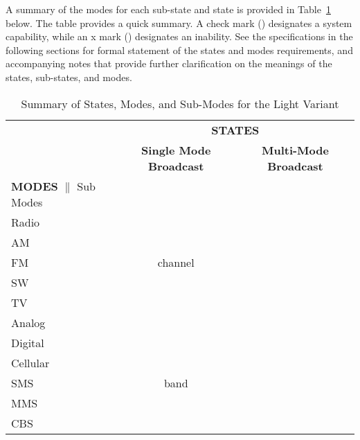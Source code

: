 A summary of the modes for each sub-state and state is provided in Table~\ref{tab:Light-StatesAndModes} below.
The table provides a quick summary. A check mark (\cmark) designates a system capability, while an x mark (\xmark) designates an inability.
See the specifications in the following sections for formal statement of the states and modes requirements, and accompanying notes that provide further clarification on the meanings of the states, sub-states, and modes.
\begin{table}[htbp]
	\begin{center}
		\begin{tabular}{|lcc|}
			\hline
			     &    \multicolumn{2}{c|}{{\bf STATES}}\\
			     & {\bf Single Mode Broadcast} & {\bf Multi-Mode Broadcast}	\\
{\bf MODES}	$\|$	Sub Modes	&		&	\\
Radio												&					&					\\\hline
\hspace{3mm}AM							& \xmark  & \xmark	\\\hline
\hspace{3mm}FM							& \cmark 1 channel &	\xmark	\\\hline
\hspace{3mm}SW							& \xmark  & \xmark	\\\hline
TV													&					&						\\\hline
\hspace{3mm}Analog 					& \xmark  & \xmark		\\\hline
\hspace{3mm}Digital					& \xmark  & \xmark		\\\hline
Cellular										&					&						\\\hline
\hspace{3mm}SMS							& \cmark 1 band  & \xmark		\\\hline
\hspace{3mm}MMS							& \xmark  & \xmark		\\\hline
\hspace{3mm}CBS							&	\xmark	&	\xmark			\\
			\hline
			\end{tabular}
				\caption{Summary of States, Modes, and Sub-Modes for the Light Variant}
				\label{tab:Light-StatesAndModes}
		\end{center}
\end{table}

